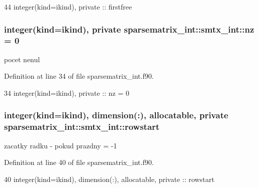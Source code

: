 \begin{DoxyCode}
44         \textcolor{keywordtype}{integer(kind=ikind)}, \textcolor{keywordtype}{private} :: firstfree
\end{DoxyCode}
\subsubsection[{nz}]{\setlength{\rightskip}{0pt plus 5cm}integer(kind=ikind), private sparsematrix\+\_\+int\+::smtx\+\_\+int\+::nz = 0\hspace{0.3cm}{\ttfamily [private]}}\label{structsparsematrix__int_1_1smtx__int_a3dc3472bd4b5935b057c2c41f05a0b45}


pocet nenul 



Definition at line 34 of file sparsematrix\+\_\+int.\+f90.


\begin{DoxyCode}
34         \textcolor{keywordtype}{integer(kind=ikind)}, \textcolor{keywordtype}{private} :: nz = 0
\end{DoxyCode}
\subsubsection[{rowstart}]{\setlength{\rightskip}{0pt plus 5cm}integer(kind=ikind), dimension(\+:), allocatable, private sparsematrix\+\_\+int\+::smtx\+\_\+int\+::rowstart\hspace{0.3cm}{\ttfamily [private]}}\label{structsparsematrix__int_1_1smtx__int_a3ed1c8a43a070cbb3e1aec3871fff430}


zacatky radku -\/ pokud prazdny = -\/1 



Definition at line 40 of file sparsematrix\+\_\+int.\+f90.


\begin{DoxyCode}
40         \textcolor{keywordtype}{integer(kind=ikind)}, \textcolor{keywordtype}{dimension(:)}, \textcolor{keywordtype}{allocatable}, \textcolor{keywordtype}{private} :: rowstart
\end{DoxyCode}
